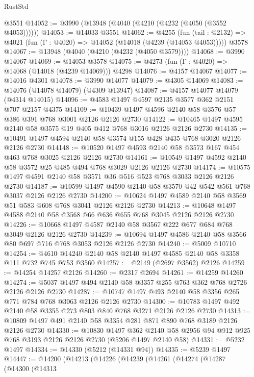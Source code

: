 \begin{lexlean}{RustStd}
\begin{coremodule}
    @3551
@14052 := @3990 (@13948 (@4040 (@4210 (@4232 (@4050 (@3552 @4053))))))
@14053 := @14033 @3551
@14062 := @4255
    (fun (tail : @2132) => @4021 (fun (Γ : @4020) => @14052 (@14018 (@4239 (@14053 @4053)))))
    @3578
@14067 := @13948 (@4040 (@4210 (@4232 (@4050 @3579))))
@14068 := @3990 @14067
@14069 := @14053 @3578
@14075 := @4273 (fun (Γ : @4020) => @14068 (@14018 (@4239 @14069))) @4298
@14076 := @4157 @14067
@14077 := @14016 @4301
@14078 := @3990 @14077
@14079 := @4305 @14069
@14083 := @14076 (@14078 @14079) (@4309 @13947)
@14087 := @4157 @14077 @14079 (@4314 @14015)
@14096 := @4583 @1497 @4597 @2135 @3577 @362 @2151 @707 @2157 @4375
@14109 := @10439 @1497 @4596 @2140 @58 @3576 @57 @386 @391 @768 @3001 @2126 @2126 @2730
@14122 := @10465 @1497 @4595 @2140 @58 @3575 @19 @405 @412 @768 @3016 @2126 @2126 @2730
@14135 := @10491 @1497 @4594 @2140 @58 @3574 @155 @428 @435 @768 @3020 @2126 @2126 @2730
@14148 := @10520 @1497 @4593 @2140 @58 @3573 @167 @454 @463 @768 @3025 @2126 @2126 @2730
@14161 := @10549 @1497 @4592 @2140 @58 @3572 @25 @485 @494 @768 @3029 @2126 @2126 @2730
@14174 := @10575 @1497 @4591 @2140 @58 @3571 @36 @516 @523 @768 @3033 @2126 @2126 @2730
@14187 := @10599 @1497 @4590 @2140 @58 @3570 @42 @542 @561 @768 @3037 @2126 @2126 @2730
@14200 := @10624 @1497 @4589 @2140 @58 @3569 @51 @583 @608 @768 @3041 @2126 @2126 @2730
@14213 := @10648 @1497 @4588 @2140 @58 @3568 @66 @636 @655 @768 @3045 @2126 @2126 @2730
@14226 := @10668 @1497 @4587 @2140 @58 @3567 @222 @677 @684 @768 @3049 @2126 @2126 @2730
@14239 := @10694 @1497 @4586 @2140 @58 @3566 @80 @697 @716 @768 @3053 @2126 @2126 @2730
@14240 := @5009 @10710
@14254 := @4610 @14240 @2140 @58 @2140 @1497 @4585 @2140 @58 @3358 @111 @732 @745 @753 @3560
@14257 := @2149 (@2697 @3562) @2126
@14259 := @14254 @14257 @2126
@14260 := @2317 @2694
@14261 := @14259 @14260
@14274 := @5037 @1497 @494 @2140 @58 @3357 @255 @763 @362 @768 @2726 @2126 @2126 @2730
@14287 := @10747 @1497 @493 @2140 @58 @3356 @265 @771 @784 @768 @3063 @2126 @2126 @2730
@14300 := @10783 @1497 @492 @2140 @58 @3355 @273 @803 @840 @768 @3271 @2126 @2126 @2730
@14313 := @10809 @1497 @491 @2140 @58 @3354 @281 @871 @890 @768 @3189 @2126 @2126 @2730
@14330 := @10830
    @1497
    @362
    @2140
    @58
    @2956
    @94
    @912
    @925
    @768
    @3193
    @2126
    @2126
    @2730
    (@5206 @1497 @2140 @58)
@14331 := @5232 @1497
@14334 := @14330 (@5212 (@14331 @94))
@14335 := @5239 @1497
@14447 := @14200
    (@14213
      (@14226
        (@14239
          (@14261
            (@14274
              (@14287
                (@14300
                  (@14313

\end{coremodule}
\end{lexlean}
